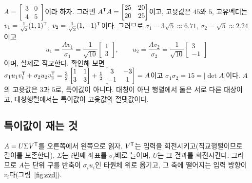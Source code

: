 \documentclass[11pt]{article}
\begin{document}
\begin{example}\label{ex:svd}
$A=\begin{bmatrix}3&0\\4&5\end{bmatrix}$이라 하자. 그러면
$A^{\mathsf{T}} A=\begin{bmatrix}25&20\\20&25\end{bmatrix}$이고, 고윳값은 $45$와 $5$,
고유벡터는 $v_1=\tfrac{1}{\sqrt2}(1,1)^{\mathsf{T}}$, $v_2=\tfrac1{\sqrt2}(1,-1)^{\mathsf{T}}$이다.
그러므로 $\sigma_1=3\sqrt5\approx6.71$, $\sigma_2=\sqrt5\approx2.24$이고
\[
   u_1=\frac{Av_1}{\sigma_1}=\frac{1}{\sqrt{10}}\begin{bmatrix}1\\3\end{bmatrix},\qquad
   u_2=\frac{Av_2}{\sigma_2}=\frac{1}{\sqrt{10}}\begin{bmatrix}3\\-1\end{bmatrix}
\]
이며, 실제로 직교한다. 확인해 보면
$\sigma_1u_1v_1^{\mathsf{T}}+\sigma_2u_2v_2^{\mathsf{T}}=\tfrac32\begin{bmatrix}1&1\\3&3\end{bmatrix}
+\tfrac12\begin{bmatrix}3&-3\\-1&1\end{bmatrix}=A$이고
$\sigma_1\sigma_2=15=|\det A|$이다. $A$의 고윳값은 $3$과 $5$로, 특이값이 아니다.
대칭이 아닌 행렬에서 둘은 서로 다른 대상이고, 대칭행렬에서는 특이값이 고윳값의
절댓값이다.
\end{example}

\subsection{특이값이 재는 것}\label{sec:svduse}
$A=U\Sigma V^{\mathsf{T}}$를 오른쪽에서 왼쪽으로 읽자. $V^{\mathsf{T}}$는 입력을 회전시키고(직교행렬이므로
길이를 보존한다), $\Sigma$는 $i$번째 좌표를 $\sigma_i$배로 늘이며, $U$는 그 결과를
회전시킨다. 그러므로 $A$는 단위 구를 반축이 $\sigma_iu_i$인 타원체 위로 옮기고, 그
축에 떨어지는 입력 방향이 $v_i$다(그림~\ref{fig:svd}).
\end{document}
